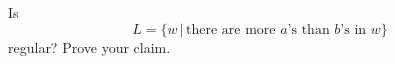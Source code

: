 Is 
\[
L = \{w \,|\, \text{there are more $a$'s than $b$'s in $w$} \}
\]
regular? Prove your claim.
